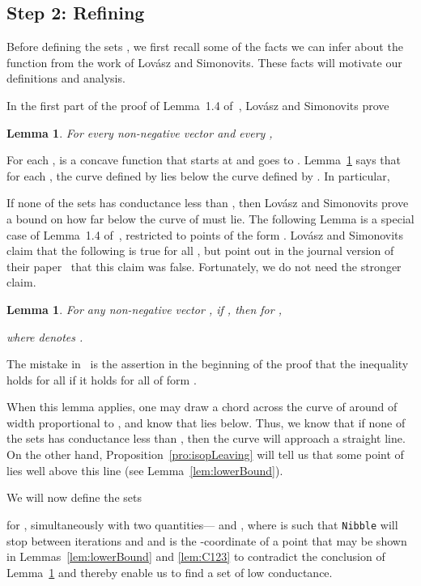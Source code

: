 \documentclass[11pt]{article}
\newtheorem{lemma}[theorem]{Lemma}
\begin{document}
\subsection*{Step 2: Refining }

Before defining the sets ,
  we first recall some of the facts we can infer about
  the function  from the work of Lov\'asz and Simonovits.
These facts will motivate our definitions and analysis.

In the first part of the proof of Lemma~1.4 of~\cite{LovaszSimonovitsFOCS},
 Lov\'asz and Simonovits prove
\begin{lemma}\label{lem:LSeasy}
For every non-negative vector  and every ,

\end{lemma}

For each ,  is a concave function that
  starts at  and goes to .
Lemma~\ref{lem:LSeasy} says that for each , the curve defined
  by  lies below the curve defined
  by .
In particular,


If none of the sets  has conductance less than ,
  then Lov\'asz and Simonovits prove a bound on how far below
   the curve of
   must lie.
The following Lemma is a special case of Lemma~1.4 of~\cite{LovaszSimonovits},
  restricted to points  of the form .
Lov\'asz and Simonovits~\cite{LovaszSimonovitsFOCS} claim that the following
  is true for all , but point out in the journal version of their 
  paper~\cite{LovaszSimonovits} that this claim was false.
Fortunately, we do not need the stronger claim.

\begin{lemma}\label{lem:LShard}
For any non-negative vector ,
  if , then
 for ,

where  denotes .
\end{lemma}

The mistake in~\cite{LovaszSimonovitsFOCS} is the assertion in the beginning
  of the proof that the inequality holds for all  if it holds for all
   of form .

When this lemma applies, one may draw a chord across the curve
  of  around  of width proportional to
  , and know that  lies below.
Thus, we know that if none of the sets 
  has conductance less than , then the curve
   will approach a straight line.
On the other hand, Proposition~\ref{pro:isopLeaving} will tell
  us that some point of  lies well above this line
  (see Lemma~\ref{lem:lowerBound}).

We will now define the sets
 
  for ,
  simultaneously with two quantities--- and ,
  where  is such that \texttt{Nibble} will stop
  between iterations  and  and 
  is the -coordinate of a point that 
  may be shown in Lemmas~\ref{lem:lowerBound} and \ref{lem:C123} to
  contradict the conclusion
  of Lemma~\ref{lem:LShard} and thereby enable us to find a set
  of low conductance.
\end{document}

